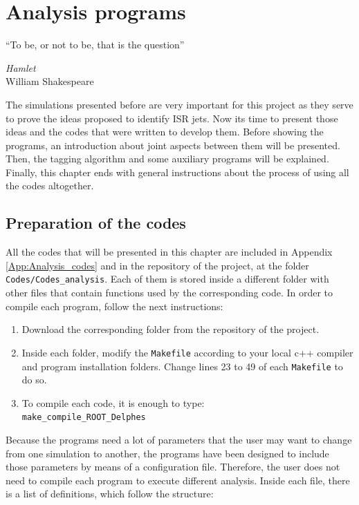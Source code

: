 \documentclass[12pt, oneside]{book}              %
\begin{document}
\chapter{Analysis programs}\label{cha:Analysis_codes}

\epigraph{\textquotedblleft To be, or not to be, that is the question\textquotedblright}{\textit{Hamlet} \\ William Shakespeare}

The simulations presented before are very important for this project 
as they serve to prove the ideas proposed to identify ISR jets. 
Now its time to present those ideas and the codes that were written
to develop them. Before showing the programs, an introduction 
about joint aspects between them will be presented. Then, the
tagging algorithm and some auxiliary programs will be explained.
Finally, this chapter ends with general instructions about the
process of using all the codes altogether.

\section[Preparation of the codes]{Preparation of the codes} \label{sec:Preparation_codes}

All the codes that will be presented in this chapter are included in Appendix \ref{App:Analysis_codes}
and in the repository of the project, at the folder \texttt{Codes/Codes\_analysis}.
Each of them is stored inside a different folder with other files that contain
functions used by the corresponding code. In order to compile each program, follow 
the next instructions:

\begin{enumerate}
\item Download the corresponding folder from the repository of the project.
\item Inside each folder, modify the \texttt{Makefile} according to your local
c++ compiler and program installation folders. Change lines 23 to 49 of each 
\texttt{Makefile} to do so.
\item To compile each code, it is enough to type:
\\ \texttt{make\_compile\_ROOT\_Delphes}
\end{enumerate}

Because the programs need a lot of parameters that the user may want to change
from one simulation to another, the programs have been designed to include 
those parameters by means of a configuration file. Therefore, the user does not
need to compile each program to execute different analysis. Inside each file,
there is a list of definitions, which follow the structure:
\end{document}
